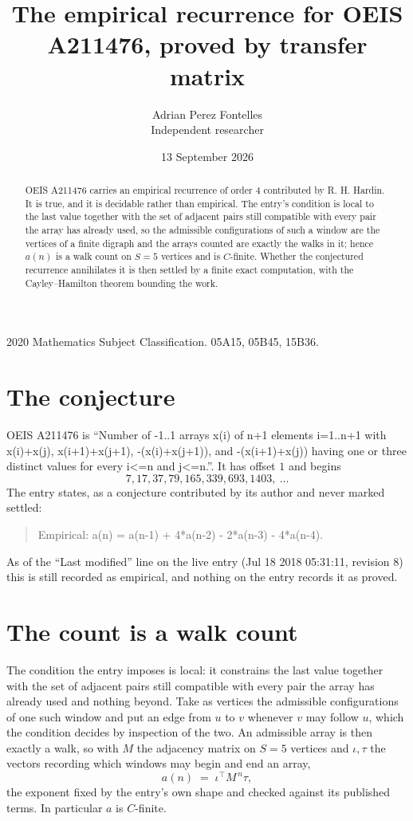 \documentclass[11pt,a4paper]{article}
\title{The empirical recurrence for OEIS A211476, proved by transfer matrix}
\author{Adrian Perez Fontelles\\ \small Independent researcher}
\date{13 September 2026}
\theoremstyle{plain}
\theoremstyle{definition}
\begin{document}
\maketitle

\begin{abstract}
OEIS A211476 carries an empirical recurrence of order $4$ contributed by R. H. Hardin. It is
true, and it is decidable rather than empirical. The entry's condition is local to the last value together with the set of adjacent pairs still compatible with every pair the array has already used, so
the admissible configurations of such a window are the vertices of a finite digraph and the
arrays counted are exactly the walks in it; hence $a(n)$ is a walk count on $S=5$ vertices
and is $C$-finite. Whether the conjectured recurrence annihilates it is then settled by a
finite exact computation, with the Cayley--Hamilton theorem bounding the work.
\end{abstract}

\noindent\small 2020 Mathematics Subject Classification. 05A15, 05B45, 15B36.\normalsize

\section{The conjecture}

OEIS A211476 is ``Number of -1..1 arrays x(i) of n+1 elements i=1..n+1 with x(i)+x(j), x(i+1)+x(j+1), -(x(i)+x(j+1)), and -(x(i+1)+x(j)) having one or three distinct values for every i<=n and j<=n.''. It has offset $1$ and begins
\[
7, 17, 37, 79, 165, 339, 693, 1403,\ \dots
\]
The entry states, as a conjecture contributed by its author and never marked settled:
\begin{quote}
Empirical: a(n) = a(n-1) + 4*a(n-2) - 2*a(n-3) - 4*a(n-4).
\end{quote}
As of the ``Last modified'' line on the live entry (Jul 18 2018 05:31:11, revision 8) this is still
recorded as empirical, and nothing on the entry records it as proved.

\section{The count is a walk count}

The condition the entry imposes is local: it constrains the last value together with the set of adjacent pairs still compatible with every pair the array has already used and nothing beyond. Take as
vertices the admissible configurations of one such window and put an edge from $u$ to $v$
whenever $v$ may follow $u$, which the condition decides by inspection of the two. An
admissible array is then exactly a walk, so with $M$ the adjacency matrix on $S=5$ vertices
and $\iota,\tau$ the vectors recording which windows may begin and end an array,
\[
a(n)\;=\;\iota^{\!\top}M^{\,n}\tau ,
\]
the exponent fixed by the entry's own shape and checked against its published terms. In
particular $a$ is $C$-finite.
\end{document}
